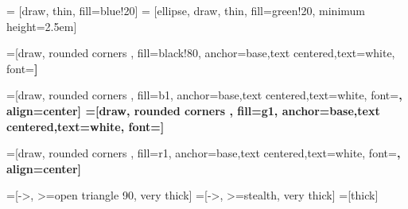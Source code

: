 \usepackage[utf8]{inputenc}
\usepackage{lmodern}
\usepackage[T1]{fontenc}
\usepackage{mathenv}
\usepackage{array}
\usepackage{amsmath}
\usepackage{mathtools}%
\usepackage{wasysym}
\usepackage{amsfonts}
\usepackage{amssymb, amsbsy}
\usepackage[utf8]{inputenc}
\usepackage{graphicx}
\usepackage{multimedia}
\usepackage{multicol}
\usepackage{multirow}
\usepackage{fourier}
\usepackage{makecell}



\usepackage{eurosym}

\usepackage{color}

\usepackage{cancel}
\usepackage{enumitem}

\usepackage{tikz}
\usetikzlibrary{shapes,arrows,shadows,calc}
\usetikzlibrary{arrows,shapes}
\usetikzlibrary{positioning}

\usepackage{verbatim}

 = [draw, thin, fill=blue!20]
 = [ellipse, draw, thin, fill=green!20, minimum height=2.5em]



=[draw, rounded corners , fill=black!80,
anchor=base,text centered,text=white, font=\bfseries] %

=[draw, rounded corners , fill=b1,
anchor=base,text centered,text=white, font=\bfseries, align=center] %
=[draw, rounded corners , fill=g1,
anchor=base,text centered,text=white, font=\bfseries] %

=[draw, rounded corners , fill=r1,
anchor=base,text centered,text=white, font=\bfseries, align=center] %

=[->, >=open triangle 90, very thick]
=[->, >=stealth, very thick]
=[thick]




\usepackage{ulem}

